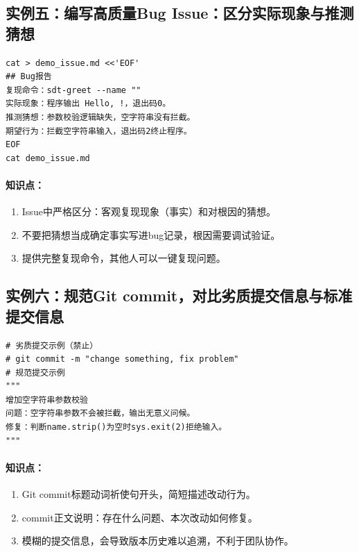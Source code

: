 \documentclass{article}
\begin{document}
\subsection*{实例五：编写高质量Bug Issue：区分实际现象与推测猜想}
\begin{lstlisting}
cat > demo_issue.md <<'EOF'
## Bug报告
复现命令：sdt-greet --name ""
实际现象：程序输出 Hello, !，退出码0。
推测猜想：参数校验逻辑缺失，空字符串没有拦截。
期望行为：拦截空字符串输入，退出码2终止程序。
EOF
cat demo_issue.md
\end{lstlisting}
\paragraph{知识点：}
\begin{enumerate}
\item Issue中严格区分：客观复现现象（事实）和对根因的猜想。
\item 不要把猜想当成确定事实写进bug记录，根因需要调试验证。
\item 提供完整复现命令，其他人可以一键复现问题。
\end{enumerate}
\subsection*{实例六：规范Git commit，对比劣质提交信息与标准提交信息}
\begin{lstlisting}
# 劣质提交示例（禁止）
# git commit -m "change something, fix problem"
# 规范提交示例
"""
增加空字符串参数校验
问题：空字符串参数不会被拦截，输出无意义问候。
修复：判断name.strip()为空时sys.exit(2)拒绝输入。
"""
\end{lstlisting}
\paragraph{知识点：}
\begin{enumerate}
\item Git commit标题动词祈使句开头，简短描述改动行为。
\item commit正文说明：存在什么问题、本次改动如何修复。
\item 模糊的提交信息，会导致版本历史难以追溯，不利于团队协作。
\end{enumerate}
\end{document}
